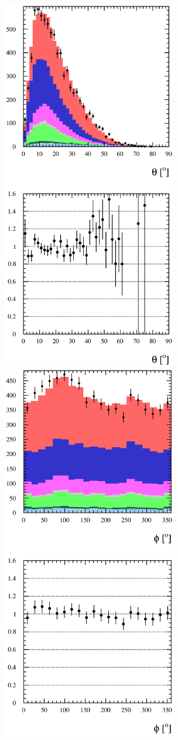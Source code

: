 \begin{figure}[h]
  \centering
  \includegraphics[width=3in]{Figures/P0DTrkThetaRun1Run2-normByRatio.eps}
  \includegraphics[width=3in]{Figures/P0DTrkPhiRun1Run2-normByRatio.eps}

\end{figure}
